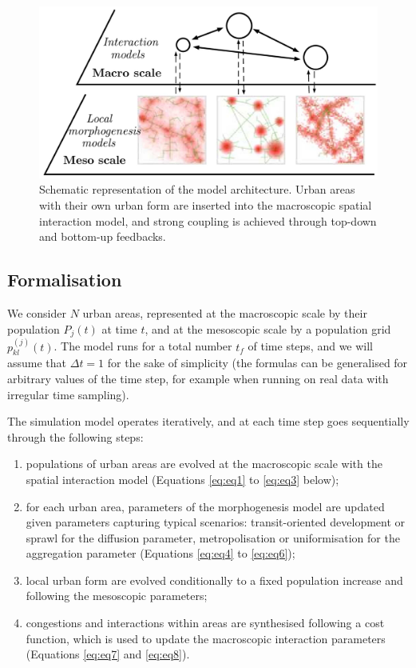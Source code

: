 \documentclass[referee,lineno,pdflatex,sn-apa]{sn-jnl}
\begin{document}
\begin{figure}[h]
 \includegraphics[width=\linewidth]{figures/Fig1.jpg}
 \caption{Schematic representation of the model architecture. Urban areas with their own urban form are inserted into the macroscopic spatial interaction model, and strong coupling is achieved through top-down and bottom-up feedbacks.\label{fig:fig1}}
\end{figure}


\subsection{Formalisation}


We consider $N$ urban areas, represented at the macroscopic scale by their population $P_j(t)$ at time $t$, and at the mesoscopic scale by a population grid $p_{kl}^{(j)}(t)$. The model runs for a total number $t_f$ of time steps, and we will assume that $\Delta t = 1$ for the sake of simplicity (the formulas can be generalised for arbitrary values of the time step, for example when running on real data with irregular time sampling).

The simulation model operates iteratively, and at each time step goes sequentially through the following steps:
\begin{enumerate}
	\item populations of urban areas are evolved at the macroscopic scale with the spatial interaction model (Equations \ref{eq:eq1} to \ref{eq:eq3} below);
	\item for each urban area, parameters of the morphogenesis model are updated given parameters capturing typical scenarios: transit-oriented development or sprawl for the diffusion parameter, metropolisation or uniformisation for the aggregation parameter (Equations \ref{eq:eq4} to \ref{eq:eq6});
	\item local urban form are evolved conditionally to a fixed population increase and following the mesoscopic parameters;
	\item congestions and interactions within areas are synthesised following a cost function, which is used to update the macroscopic interaction parameters (Equations \ref{eq:eq7} and \ref{eq:eq8}).
\end{enumerate}
\end{document}
